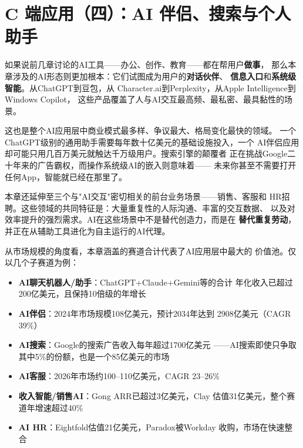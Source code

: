 
\chapter{C 端应用（四）：AI 伴侣、搜索与个人助手}
\label{ch:consumer-social}


如果说前几章讨论的AI工具——办公、创作、教育——都在帮用户\textbf{做事}，
那么本章涉及的AI形态则更加根本：它们试图成为用户的\textbf{对话伙伴}、
\textbf{信息入口}和\textbf{系统级智能}。从ChatGPT到豆包，从
Character.ai到Perplexity，从Apple Intelligence到Windows Copilot，
这些产品覆盖了人与AI交互最高频、最私密、最具黏性的场景。

这也是整个AI应用层中商业模式最多样、争议最大、格局变化最快的领域。
一个ChatGPT级别的通用助手需要每年数十亿美元的基础设施投入，一个
AI伴侣应用却可能只用几百万美元就触达千万级用户。搜索引擎的颠覆者
正在挑战Google二十年来的广告霸权，而操作系统级AI的嵌入则意味着——
未来你甚至不需要打开任何App，智能就已经在那里了。

本章还延伸至三个与"AI交互"密切相关的前台业务场景——销售、客服和
HR招聘。这些领域的共同特征是：大量重复性的人际沟通、丰富的交互数据、
以及对效率提升的强烈需求。AI在这些场景中不是替代创造力，而是在
\textbf{替代重复劳动}，并正在从辅助工具进化为自主运行的AI代理。

从市场规模的角度看，本章涵盖的赛道合计代表了AI应用层中最大的
价值池。仅以几个子赛道为例：

\begin{itemize}
  \item \textbf{AI聊天机器人/助手}：ChatGPT+Claude+Gemini等的合计
    年化收入已超过200亿美元，且保持10倍级的年增长
  \item \textbf{AI伴侣}：2024年市场规模108亿美元，预计2034年达到
    2908亿美元（CAGR 39\%）
  \item \textbf{AI搜索}：Google的搜索广告收入每年超过1700亿美元
    ——AI搜索即使只争取其中5\%的份额，也是一个85亿美元的市场
  \item \textbf{AI客服}：2026年市场约100--110亿美元，CAGR 23--26\%
  \item \textbf{收入智能/销售AI}：Gong ARR已超过3亿美元，Clay
    估值31亿美元，整个赛道年增速超过40\%
  \item \textbf{AI HR}：Eightfold估值21亿美元，Paradox被Workday
    收购，市场在快速整合
\end{itemize}

